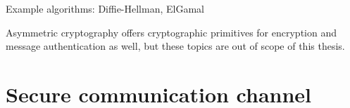 Example algorithms: Diffie-Hellman, ElGamal

Asymmetric cryptography offers cryptographic primitives for encryption and message authentication as well, but these topics are out of scope of this thesis.

% 
% 

% 
% 

\section{Secure communication channel}




